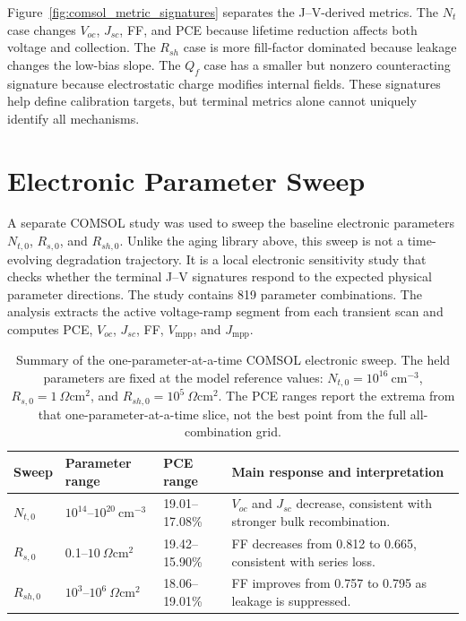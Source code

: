 Figure~\ref{fig:comsol_metric_signatures} separates the J--V-derived metrics.
The $N_t$ case changes $V_{oc}$, $J_{sc}$, FF, and PCE because lifetime
reduction affects both voltage and collection. The $R_{sh}$ case is more
fill-factor dominated because leakage changes the low-bias slope. The $Q_f$
case has a smaller but nonzero counteracting signature because electrostatic
charge modifies internal fields. These signatures help define calibration
targets, but terminal metrics alone cannot uniquely identify all mechanisms.

\section{Electronic Parameter Sweep}

A separate COMSOL study was used to sweep the baseline electronic parameters
$N_{t,0}$, $R_{s,0}$, and $R_{sh,0}$. Unlike the aging library above, this
sweep is not a time-evolving degradation trajectory. It is a local electronic
sensitivity study that checks whether the terminal J--V signatures respond to
the expected physical parameter directions. The study contains 819 parameter
combinations. The analysis extracts the active voltage-ramp segment from each
transient scan and computes PCE,
$V_{oc}$, $J_{sc}$, FF, $V_{\mathrm{mpp}}$, and $J_{\mathrm{mpp}}$.

\begin{table}[H]
\centering
\caption{Summary of the one-parameter-at-a-time COMSOL electronic sweep. The
held parameters are fixed at the model reference values:
$N_{t,0}=10^{16}~\mathrm{cm^{-3}}$, $R_{s,0}=1~\Omega\mathrm{cm^2}$, and
$R_{sh,0}=10^{5}~\Omega\mathrm{cm^2}$. The PCE ranges report the extrema from
that one-parameter-at-a-time slice, not the best point from the full
all-combination grid.}
\label{tab:parameter_sweep_summary}
\begin{tabular}{@{}p{}p{}p{}p{}@{}}
\toprule
Sweep & Parameter range & PCE range & Main response and interpretation \\
\midrule
$N_{t,0}$ &
$10^{14}$--$10^{20}~\mathrm{cm^{-3}}$ &
19.01--17.08\% &
$V_{oc}$ and $J_{sc}$ decrease, consistent with stronger bulk recombination. \\
$R_{s,0}$ &
0.1--$10~\Omega\mathrm{cm^2}$ &
19.42--15.90\% &
FF decreases from 0.812 to 0.665, consistent with series loss. \\
$R_{sh,0}$ &
$10^{3}$--$10^{6}~\Omega\mathrm{cm^2}$ &
18.06--19.01\% &
FF improves from 0.757 to 0.795 as leakage is suppressed. \\
\bottomrule
\end{tabular}
\end{table}

